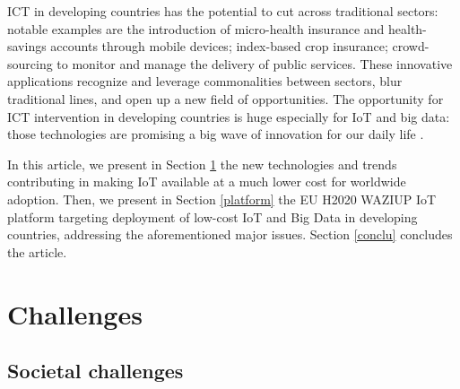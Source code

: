 \documentclass[10pt, conference, compsocconf]{IEEEtran}
\newcommand {\0} {\mathbf 0}
\newcommand {\1} {\mathbf 1}
\begin{document}
ICT in developing countries has the potential to cut across traditional sectors: notable examples are the introduction of micro-health insurance and health-savings accounts through mobile devices; index-based crop insurance; crowd-sourcing to monitor and manage the delivery of public services.
These innovative applications recognize and leverage commonalities between sectors, blur traditional lines, and open up a new field of opportunities.
The opportunity for ICT intervention in developing countries is huge especially for IoT and big data: those technologies are promising a big wave of innovation for our daily life \cite{Sarkar2016,ITU2015}.

In this article, we present in Section \ref{iot} the new technologies and trends contributing in making IoT available at a much lower cost for worldwide adoption.
Then, we present in Section \ref{platform} the EU H2020 WAZIUP IoT platform targeting deployment of low-cost IoT and Big Data in developing countries, addressing the aforementioned major issues.
Section \ref{conclu} concludes the article.

\section{Challenges}
\label{iot}

\subsection{Societal challenges}
\end{document}
